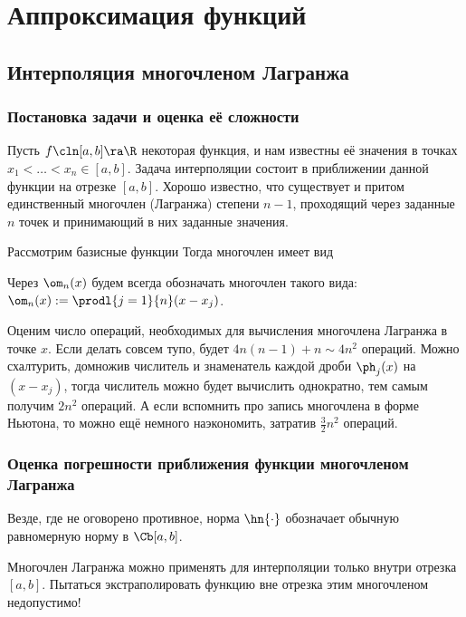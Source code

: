 \documentclass[a4paper]{article}
\begin{document}
\pagebreak

\section{Аппроксимация функций}

\subsection{Интерполяция многочленом Лагранжа}

\subsubsection{Постановка задачи и оценка её сложности}

Пусть $f\cln[a,b]\ra \R$ некоторая функция, и нам известны её значения
в точках $x_1<\dots< x_n\in [a,b]$. Задача интерполяции состоит в
приближении данной функции на отрезке $[a,b]$. Хорошо известно, что
существует и притом единственный многочлен (Лагранжа) степени $n-1$,
проходящий через заданные $n$ точек и принимающий в них заданные
значения.

Рассмотрим базисные функции   Тогда многочлен имеет вид 

Через $\om_n(x)$ будем всегда обозначать многочлен такого вида:
$\om_n(x) := \prodl{j=1}{n}(x-x_j)$.

Оценим число операций, необходимых для вычисления многочлена Лагранжа
в точке $x$. Если делать совсем тупо, будет $4n(n-1)+n \sim 4 n^2$
операций. Можно схалтурить, домножив числитель и знаменатель каждой
дроби $\ph_j(x)$ на $(x-x_j)$, тогда числитель можно будет вычислить
однократно, тем самым получим $2n^2$ операций. А если вспомнить про
запись многочлена в форме Ньютона, то можно ещё немного наэкономить,
затратив $\frac32n^2$ операций.

\subsubsection{Оценка погрешности приближения функции многочленом Лагранжа}

Везде, где не оговорено противное, норма $\hn{\cdot}$ обозначает
обычную равномерную норму в $\Cb[a,b]$.

\begin{note}
Многочлен Лагранжа можно применять для интерполяции только внутри
отрезка $[a,b]$.  Пытаться экстраполировать функцию вне отрезка этим
многочленом недопустимо!
\end{note}
\end{document}
